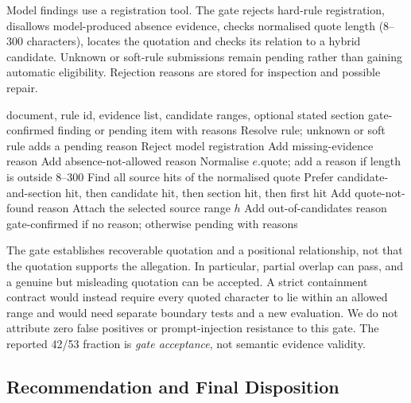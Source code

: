 Model findings use a registration tool. The gate rejects hard-rule registration, disallows model-produced absence evidence, checks normalised quote length (8--300 characters), locates the quotation and checks its relation to a hybrid candidate. Unknown or soft-rule submissions remain pending rather than gaining automatic eligibility. Rejection reasons are stored for inspection and possible repair.

\begin{algo}[H]
\caption{Gate in the evaluated prototype (simplified). Scope membership is overlap, not complete containment; location does not establish entailment.}
\label{alg:gate}
\begin{algorithmic}[1]
\Require document, rule id, evidence list, candidate ranges, optional stated section
\Ensure gate-confirmed finding or pending item with reasons
\State Resolve rule; unknown or soft rule adds a pending reason
 \State Reject model registration \EndIf
{} \State Add missing-evidence reason \EndIf
{}
    \State Add absence-not-allowed reason
  \EndIf
  \State Normalise $e.\text{quote}$; add a reason if length is outside 8--300
  \State Find all source hits of the normalised quote
  \State Prefer candidate-and-section hit, then candidate hit, then section hit, then first hit
   \State Add quote-not-found reason
  \Else
    \State Attach the selected source range $h$
     \State Add out-of-candidates reason \EndIf
  \EndIf
\EndFor
\State \Return gate-confirmed if no reason; otherwise pending with reasons
\end{algorithmic}
\end{algo}

The gate establishes recoverable quotation and a positional relationship, not that the quotation supports the allegation. In particular, partial overlap can pass, and a genuine but misleading quotation can be accepted. A strict containment contract would instead require every quoted character to lie within an allowed range and would need separate boundary tests and a new evaluation. We do not attribute zero false positives or prompt-injection resistance to this gate. The reported 42/53 fraction is \emph{gate acceptance}, not semantic evidence validity.

\subsection{Recommendation and Final Disposition}\label{sec:policy}

